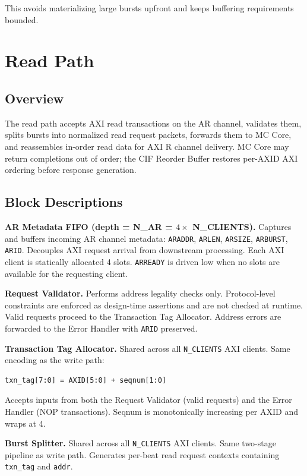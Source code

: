 This avoids materializing large bursts upfront and keeps buffering requirements bounded.

\section{Read Path}

\subsection{Overview}

The read path accepts AXI read transactions on the AR channel, validates them, splits bursts into normalized read request packets, forwards them to MC Core, and reassembles in-order read data for AXI R channel delivery. MC Core may return completions out of order; the CIF Reorder Buffer restores per-AXID AXI ordering before response generation.

\subsection{Block Descriptions}

\textbf{AR Metadata FIFO (depth = N\_AR = $4 \times$ N\_CLIENTS).}
Captures and buffers incoming AR channel metadata: \texttt{ARADDR}, \texttt{ARLEN}, \texttt{ARSIZE}, \texttt{ARBURST}, \texttt{ARID}. Decouples AXI request arrival from downstream processing. Each AXI client is statically allocated 4 slots. \texttt{ARREADY} is driven low when no slots are available for the requesting client.

\textbf{Request Validator.}
Performs address legality checks only. Protocol-level constraints are enforced as design-time assertions and are not checked at runtime. Valid requests proceed to the Transaction Tag Allocator. Address errors are forwarded to the Error Handler with \texttt{ARID} preserved.

\textbf{Transaction Tag Allocator.}
Shared across all \texttt{N\_CLIENTS} AXI clients. Same encoding as the write path:
\begin{lstlisting}
txn_tag[7:0] = AXID[5:0] + seqnum[1:0]
\end{lstlisting}
Accepts inputs from both the Request Validator (valid requests) and the Error Handler (NOP transactions). Seqnum is monotonically increasing per AXID and wraps at 4.

\textbf{Burst Splitter.}
Shared across all \texttt{N\_CLIENTS} AXI clients. Same two-stage pipeline as write path. Generates per-beat read request contexts containing \texttt{txn\_tag} and \texttt{addr}.

